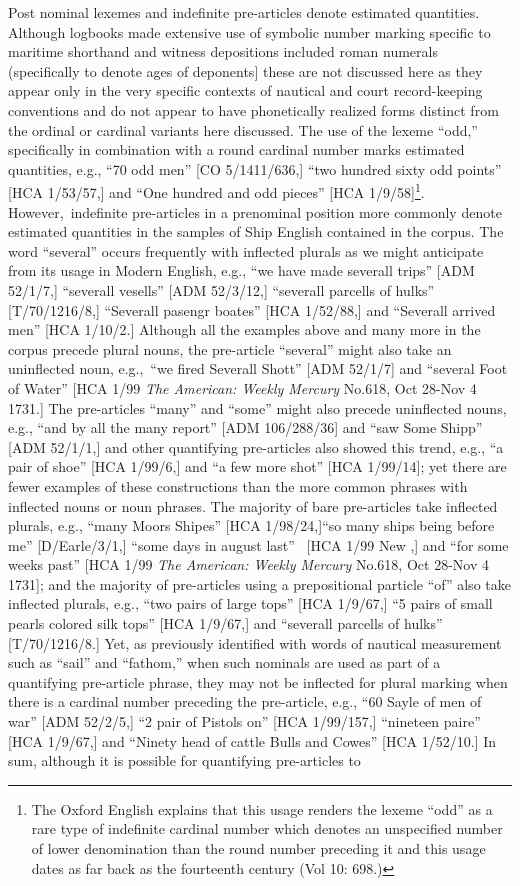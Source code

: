 Post nominal lexemes and indefinite pre-articles denote estimated quantities. Although logbooks made extensive use of symbolic number marking specific to maritime shorthand and witness depositions included roman numerals (specifically to denote ages of deponents] these are not discussed here as they appear only in the very specific contexts of nautical and court record-keeping conventions and do not appear to have phonetically realized forms distinct from the ordinal or cardinal variants here discussed.  The use of the lexeme “odd,” specifically in combination with a round cardinal number marks estimated quantities, e.g., “70 odd men” [CO 5/1411/636,] “two hundred sixty odd points” [HCA 1/53/57,] and “One hundred and odd pieces” [HCA 1/9/58]\footnote{The Oxford English \citet{Dictionary1989} explains that this usage renders the lexeme “odd” as a rare type of indefinite cardinal number which denotes an unspecified number of lower denomination than the round number preceding it and this usage dates as far back as the fourteenth century (Vol 10: 698.)}.  However,~indefinite pre-articles in a prenominal position more commonly denote estimated quantities in the samples of Ship English contained in the corpus. The word “several” occurs frequently with inflected plurals as we might anticipate from its usage in Modern English, e.g., “we have made severall trips” [ADM 52/1/7,] “severall vesells” [ADM 52/3/12,] “severall parcells of hulks” [T/70/1216/8,] “Severall pasengr boates” [HCA 1/52/88,] and “Severall arrived men” [HCA 1/10/2.] Although all the examples above and many more in the corpus precede plural nouns, the pre-article “several” might also take an uninflected noun, e.g.,~“we fired Severall Shott” [ADM 52/1/7] and “several Foot of Water” [HCA 1/99 \textit{The American: Weekly Mercury} No.618, Oct 28-Nov 4 1731.] The pre-articles “many” and “some” might also precede uninflected nouns, e.g., “and by all the many report” [ADM 106/288/36] and “saw Some Shipp” [ADM 52/1/1,] and other quantifying pre-articles also showed this trend, e.g., “a pair of shoe” [HCA 1/99/6,] and “a few more shot” [HCA 1/99/14]; yet there are fewer examples of these constructions than the more common phrases with inflected nouns or noun phrases. The majority of bare pre-articles take inflected plurals, e.g., “many Moors Shipes” [HCA 1/98/24,]“so many ships being before me” [D/Earle/3/1,] “some days in august last” ~[HCA 1/99 New \citealt{Providence1722},] and “for some weeks past” [HCA 1/99 \textit{The American: Weekly Mercury} No.618, Oct 28-Nov 4 1731]; and the majority of pre-articles using a prepositional particle “of” also take inflected plurals, e.g., “two pairs of large tops” [HCA 1/9/67,] “5 pairs of small pearls colored silk tops” [HCA 1/9/67,] and “severall parcells of hulks” [T/70/1216/8.] Yet, as previously identified with words of nautical measurement such as “sail” and “fathom,” when such nominals are used as part of a quantifying pre-article phrase, they may not be inflected for plural marking when there is a cardinal number preceding the pre-article, e.g., “60 Sayle of men of war” [ADM 52/2/5,] “2 pair of Pistols on” [HCA 1/99/157,] “nineteen paire” [HCA 1/9/67,] and “Ninety head of cattle Bulls and Cowes” [HCA 1/52/10.] In sum, although it is possible for quantifying pre-articles to 